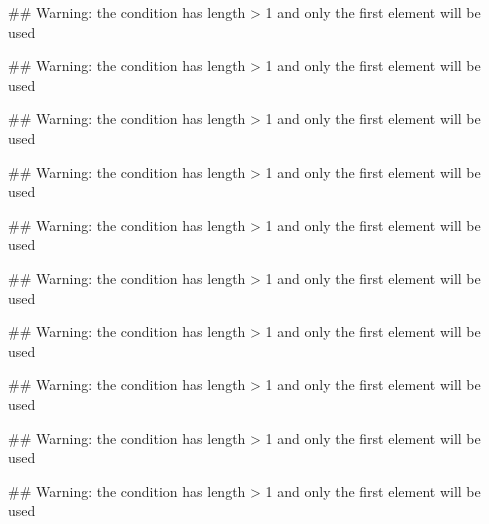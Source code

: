 \documentclass{article}\usepackage{graphicx, color}
\makeatletter
\newenvironment{kframe}{%
 \def\at@end@of@kframe{}%
 \ifinner\ifhmode%
  \def\at@end@of@kframe{\end{minipage}}%
  \begin{minipage}{\columnwidth}%
 \fi\fi%
 \def\FrameCommand##1{\hskip\@totalleftmargin \hskip-\fboxsep
 \colorbox{shadecolor}{##1}\hskip-\fboxsep
     \hskip-\linewidth \hskip-\@totalleftmargin \hskip\columnwidth}%
 \MakeFramed {\advance\hsize-\width
   \@totalleftmargin\z@ \linewidth\hsize
   \@setminipage}}%
 {\par\unskip\endMakeFramed%
 \at@end@of@kframe}
\newenvironment{knitrout}{}{} %
\makeatother
\begin{document}
\begin{enumerate}
\begin{shaded}
\begin{knitrout}
\begin{kframe}
{\ttfamily\noindent\textcolor{warningcolor}{\#\# Warning: the condition has length > 1 and only the first element will be used}}

{\ttfamily\noindent\textcolor{warningcolor}{\#\# Warning: the condition has length > 1 and only the first element will be used}}

{\ttfamily\noindent\textcolor{warningcolor}{\#\# Warning: the condition has length > 1 and only the first element will be used}}

{\ttfamily\noindent\textcolor{warningcolor}{\#\# Warning: the condition has length > 1 and only the first element will be used}}

{\ttfamily\noindent\textcolor{warningcolor}{\#\# Warning: the condition has length > 1 and only the first element will be used}}

{\ttfamily\noindent\textcolor{warningcolor}{\#\# Warning: the condition has length > 1 and only the first element will be used}}

{\ttfamily\noindent\textcolor{warningcolor}{\#\# Warning: the condition has length > 1 and only the first element will be used}}

{\ttfamily\noindent\textcolor{warningcolor}{\#\# Warning: the condition has length > 1 and only the first element will be used}}

{\ttfamily\noindent\textcolor{warningcolor}{\#\# Warning: the condition has length > 1 and only the first element will be used}}

{\ttfamily\noindent\textcolor{warningcolor}{\#\# Warning: the condition has length > 1 and only the first element will be used}}\end{kframe}
\end{knitrout}


\end{shaded}
\end{enumerate}
\end{document}
